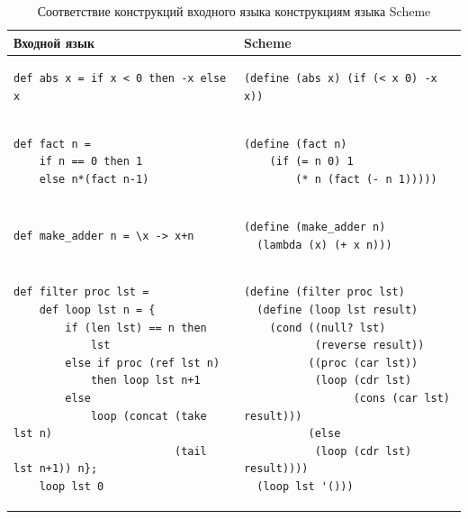 \documentclass[12pt,a4paper,oneside]{extarticle}
\begin{document}
        
        \begin{table}[h!]
                      
            \caption{Соответствие конструкций входного языка конструкциям языка Scheme \bigskip}
            \centering 
            
            \begin{sideways}
            \label{tabular:syntax}  
            \begin{tabular}{|l|l|}
                \hline
                \textbf{Входной язык} & \textbf{Scheme}
                \\ \hline
                    \begin{lstlisting}
def abs x = if x < 0 then -x else x
                   \end{lstlisting} &
                    \begin{lstlisting}
(define (abs x) (if (< x 0) -x x))
                    \end{lstlisting}
                \\ \hline
                    \begin{lstlisting}
def fact n = 
    if n == 0 then 1
    else n*(fact n-1)
                    \end{lstlisting} &
                    \begin{lstlisting}
(define (fact n)
    (if (= n 0) 1
        (* n (fact (- n 1)))))
                    \end{lstlisting}
                \\ \hline
                    \begin{lstlisting}
def make_adder n = \x -> x+n
                    \end{lstlisting} &
                    \begin{lstlisting}
(define (make_adder n) 
  (lambda (x) (+ x n)))
                    \end{lstlisting}
                \\ \hline
                    \begin{lstlisting}
def filter proc lst = 
    def loop lst n = {
        if (len lst) == n then 
            lst
        else if proc (ref lst n) 
            then loop lst n+1
        else 
            loop (concat (take lst n)
                         (tail lst n+1)) n};
    loop lst 0
                    \end{lstlisting} &
                    \begin{lstlisting}
(define (filter proc lst)
  (define (loop lst result)
    (cond ((null? lst) 
           (reverse result))
          ((proc (car lst)) 
           (loop (cdr lst) 
                 (cons (car lst) result)))
          (else 
           (loop (cdr lst) result))))
  (loop lst '()))
                    \end{lstlisting}
                \\ \hline
            \end{tabular}
        

\end{sideways}
\end{table}
\end{document}
